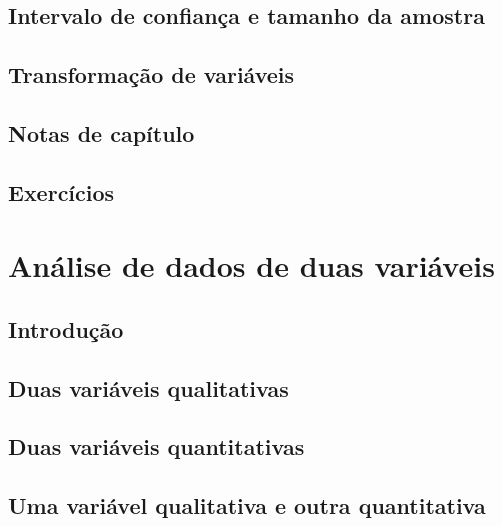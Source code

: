 \documentclass[
]{latex/krantz}
\theoremstyle{definition}
\theoremstyle{definition}
\theoremstyle{definition}
\theoremstyle{definition}
\theoremstyle{remark}
\begin{document}
\hypertarget{intervalo-de-confianuxe7a-e-tamanho-da-amostra}{%
\section{Intervalo de confiança e tamanho da amostra}\label{intervalo-de-confianuxe7a-e-tamanho-da-amostra}}

\hypertarget{transformauxe7uxe3o-de-variuxe1veis}{%
\section{Transformação de variáveis}\label{transformauxe7uxe3o-de-variuxe1veis}}

\hypertarget{notas-de-capuxedtulo-1}{%
\section{Notas de capítulo}\label{notas-de-capuxedtulo-1}}

\hypertarget{exercuxedcios-1}{%
\section{Exercícios}\label{exercuxedcios-1}}

\hypertarget{anuxe1lise-de-dados-de-duas-variuxe1veis}{%
\chapter{Análise de dados de duas variáveis}\label{anuxe1lise-de-dados-de-duas-variuxe1veis}}

\hypertarget{introduuxe7uxe3o-2}{%
\section{Introdução}\label{introduuxe7uxe3o-2}}

\hypertarget{duas-variuxe1veis-qualitativas}{%
\section{Duas variáveis qualitativas}\label{duas-variuxe1veis-qualitativas}}

\hypertarget{duas-variuxe1veis-quantitativas}{%
\section{Duas variáveis quantitativas}\label{duas-variuxe1veis-quantitativas}}

\hypertarget{uma-variuxe1vel-qualitativa-e-outra-quantitativa}{%
\section{Uma variável qualitativa e outra quantitativa}\label{uma-variuxe1vel-qualitativa-e-outra-quantitativa}}
\end{document}
